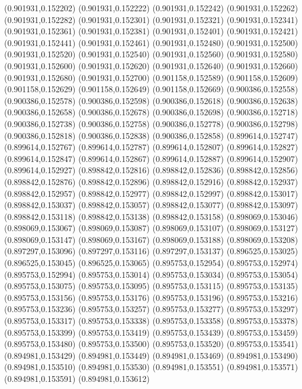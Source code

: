 (0.901931,0.152202)
(0.901931,0.152222)
(0.901931,0.152242)
(0.901931,0.152262)
(0.901931,0.152282)
(0.901931,0.152301)
(0.901931,0.152321)
(0.901931,0.152341)
(0.901931,0.152361)
(0.901931,0.152381)
(0.901931,0.152401)
(0.901931,0.152421)
(0.901931,0.152441)
(0.901931,0.152461)
(0.901931,0.152480)
(0.901931,0.152500)
(0.901931,0.152520)
(0.901931,0.152540)
(0.901931,0.152560)
(0.901931,0.152580)
(0.901931,0.152600)
(0.901931,0.152620)
(0.901931,0.152640)
(0.901931,0.152660)
(0.901931,0.152680)
(0.901931,0.152700)
(0.901158,0.152589)
(0.901158,0.152609)
(0.901158,0.152629)
(0.901158,0.152649)
(0.901158,0.152669)
(0.900386,0.152558)
(0.900386,0.152578)
(0.900386,0.152598)
(0.900386,0.152618)
(0.900386,0.152638)
(0.900386,0.152658)
(0.900386,0.152678)
(0.900386,0.152698)
(0.900386,0.152718)
(0.900386,0.152738)
(0.900386,0.152758)
(0.900386,0.152778)
(0.900386,0.152798)
(0.900386,0.152818)
(0.900386,0.152838)
(0.900386,0.152858)
(0.899614,0.152747)
(0.899614,0.152767)
(0.899614,0.152787)
(0.899614,0.152807)
(0.899614,0.152827)
(0.899614,0.152847)
(0.899614,0.152867)
(0.899614,0.152887)
(0.899614,0.152907)
(0.899614,0.152927)
(0.898842,0.152816)
(0.898842,0.152836)
(0.898842,0.152856)
(0.898842,0.152876)
(0.898842,0.152896)
(0.898842,0.152916)
(0.898842,0.152937)
(0.898842,0.152957)
(0.898842,0.152977)
(0.898842,0.152997)
(0.898842,0.153017)
(0.898842,0.153037)
(0.898842,0.153057)
(0.898842,0.153077)
(0.898842,0.153097)
(0.898842,0.153118)
(0.898842,0.153138)
(0.898842,0.153158)
(0.898069,0.153046)
(0.898069,0.153067)
(0.898069,0.153087)
(0.898069,0.153107)
(0.898069,0.153127)
(0.898069,0.153147)
(0.898069,0.153167)
(0.898069,0.153188)
(0.898069,0.153208)
(0.897297,0.153096)
(0.897297,0.153116)
(0.897297,0.153137)
(0.896525,0.153025)
(0.896525,0.153045)
(0.896525,0.153065)
(0.895753,0.152954)
(0.895753,0.152974)
(0.895753,0.152994)
(0.895753,0.153014)
(0.895753,0.153034)
(0.895753,0.153054)
(0.895753,0.153075)
(0.895753,0.153095)
(0.895753,0.153115)
(0.895753,0.153135)
(0.895753,0.153156)
(0.895753,0.153176)
(0.895753,0.153196)
(0.895753,0.153216)
(0.895753,0.153236)
(0.895753,0.153257)
(0.895753,0.153277)
(0.895753,0.153297)
(0.895753,0.153317)
(0.895753,0.153338)
(0.895753,0.153358)
(0.895753,0.153378)
(0.895753,0.153399)
(0.895753,0.153419)
(0.895753,0.153439)
(0.895753,0.153459)
(0.895753,0.153480)
(0.895753,0.153500)
(0.895753,0.153520)
(0.895753,0.153541)
(0.894981,0.153429)
(0.894981,0.153449)
(0.894981,0.153469)
(0.894981,0.153490)
(0.894981,0.153510)
(0.894981,0.153530)
(0.894981,0.153551)
(0.894981,0.153571)
(0.894981,0.153591)
(0.894981,0.153612)

